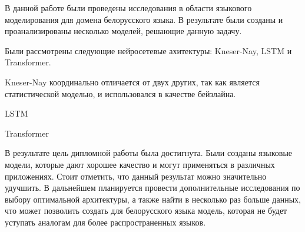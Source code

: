 
В данной работе были проведены исследования в области языкового моделирования для домена белорусского языка. В результате были созданы и проанализированы несколько моделей, решающие данную задачу.

Были рассмотрены следующие нейросетевые ахитектуры: Kneser-Nay, LSTM и Transformer. 

Kneser-Nay координально отличается от двух других, так как является статистической моделью, и использовался в качестве бейзлайна.

LSTM

Transformer 

В результате цель дипломной работы была достигнута. Были созданы языковые модели, которые дают хорошее качество и могут применяться в различных приложениях. Стоит отметить, что данный результат можно значительно удучшить. В дальнейшем планируется провести дополнительные исследования по выбору оптимальной архитектуры, а также найти в несколько раз больше данных, что может позволить создать для белорусского языка модель, которая не будет уступать аналогам для более распространенных языков.